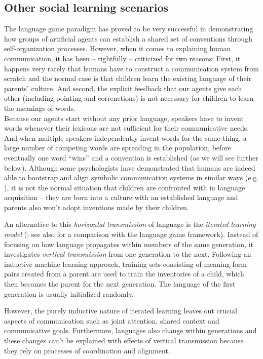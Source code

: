 \subsection{Other social learning scenarios}

The language game paradigm has proved to be very successful in
demonstrating how groups of artificial agents can establish a shared
set of conventions through self-organization processes. However, when
it comes to explaining human communication, it has been -- rightfully
-- criticized for two reasons: First, it happens very rarely that
humans have to construct a communication system from scratch and the
normal case is that children learn the existing language of their
parents' culture. And second, the explicit feedback that our agents
give each other (including pointing and correnctions) is not necessary
for children to learn the
meanings of words.\\

\noindent Because our agents start without any prior language, speakers have to
invent words whenever their lexicons are not sufficient for their
communicative needs. And when multiple speakers independently invent
words for the same thing, a large number of competing words are
spreading in the population, before eventually one word ``wins'' and a
convention is established (as we will see further below). Although
some psychologists have demonstrated that humans are indeed able to
bootstrap and align symbolic communication systems in similar ways
(e.g. \citealp{galantucci05experimental,healey07graphical}), it is not
the normal situation that children are confronted with in language
acquisition -- they are born into a culture with an established
language and parents also won't adopt inventions made by their
children.

An alternative to this \emph{horizontal transmission} of language is
the \emph{iterated learning model}
(\citealp*{kirby01spontaneous,smith03iterated}; see also
\citealp{steels02iterated} for a comparison with the language game
framework). Instead of focusing on how language propagates within
members of the same generation, it investigates \emph{vertical
  transmission} from one generation to the next. Following an
inductive machine learning approach, training sets consisting of
meaning-form pairs created from a parent are used to train the
inventories of a child, which then becomes the parent for the next
generation. The language of the first generation is usually
initialized randomly.

However, the purely inductive nature of iterated learning leaves out
crucial aspects of communication such as joint attention, shared
context and communicative goals. Furthermore, languages also change
within generations and these changes can't be explained with effects
of vertical transmission because they rely on processes of
coordination and alignment.\\


